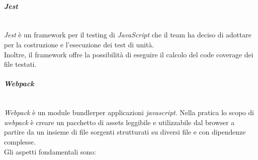 \paragraph{\textit{Jest}}\-\\
\label{jest}
\textit{Jest} è un framework per il testing di \textit{JavaScript} che il team ha deciso di adottare per la costruzione e l'esecuzione dei test di unità.\\
Inoltre, il framework offre la possibilità di eseguire il calcolo del code coverage dei file testati.

\paragraph{\textit{Webpack}} \label{webpack}\-\\
\textit{Webpack} è un module bundler\glossario per applicazioni \textit{javascript}. Nella pratica lo scopo di \textit{webpack} è creare un pacchetto di assets leggibile e utilizzabile dal browser a partire da un insieme di file sorgenti strutturati su diversi file e con dipendenze complesse. \\
Gli aspetti fondamentali sono:

